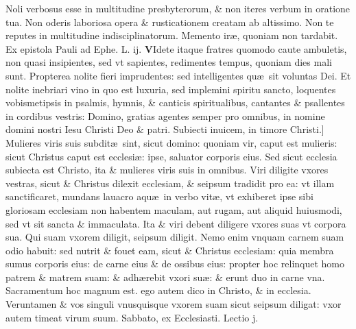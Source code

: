 \documentclass[a5paper,10pt]{book}
\def\leftmarginnote{%
	\lrmarginnote{\hskip -\marginparsep \hskip -6.5em}}
\def\ae{æ}
\begin{document}
\begin{multicols*}{2}
Noli verbosus esse in multitudine presbyterorum, \& non iteres verbum in oratione tua.
Non oderis laboriosa opera \& rusticationem creatam ab altissimo. Non te reputes in multitudine indisciplinatorum. Memento ir\ae , quoniam non tardabit.
\fancyhead[C]{\color{red} Feria. vj. Dominic\ae . ij. Vagantium}
\newline {} \color{red} Ex epistola Pauli ad Ephe. \hfill L. ij. \color{black}
\vspace{-1.25em}
\lettrine[lines=2]{\bfseries \color{red} V}{}\textdagger Idete\leftmarginnote{\begin{flushright}c.5.c\end{flushright}} itaque fratres quomodo caute ambuletis, non quasi insipientes, sed vt sapientes, redimentes tempus, quoniam dies mali sunt.
Propterea nolite fieri imprudentes: sed intelligentes qu\ae \ sit voluntas Dei. Et nolite inebriari vino in quo est luxuria, sed implemini spiritu sancto, loquentes vobismetipsis in psalmis, hymnis, \& canticis spiritualibus, cantantes \& psallentes in cordibus vestris: Domino, gratias agentes semper pro omnibus, in nomine domini nostri Iesu Christi Deo \& patri.
Subiecti inuicem, in timore\leftmarginnote{\begin{flushright}D\end{flushright}} Christi.] Mulieres viris suis subdit\ae \ sint, sicut domino: quoniam vir, caput est mulieris: sicut Christus caput est ecclesi\ae : ipse, saluator corporis eius.
Sed sicut ecclesia subiecta est Christo, ita \& mulieres viris suis in omnibus.
Viri diligite vxores vestras, sicut \& Christus dilexit ecclesiam, \& seipsum tradidit pro ea: vt illam sanctificaret, mundans lauacro aqu\ae \ in verbo vit\ae , vt exhiberet ipse sibi gloriosam ecclesiam non habentem maculam, aut rugam, aut aliquid huiusmodi, sed vt sit sancta \& immaculata.
Ita \& viri debent diligere vxores suas vt corpora sua. Qui suam vxorem diligit, seipsum diligit. Nemo enim vnquam carnem suam odio habuit: sed nutrit \& fouet eam, sicut \& Christus ecclesiam: quia membra sumus corporis eius: de carne eius \& de ossibus eius: propter hoc relinquet homo patrem \& matrem suam: \& adh\ae rebit vxori su\ae : \& erunt duo in carne vna.
Sacramentum hoc magnum est. ego autem dico in Christo, \& in ecclesia. Veruntamen \& vos singuli vnusquisque vxorem suam sicut seipsum diligat: vxor autem timeat virum suum.
\newline {} \color{red} \hypertarget{SAT-SECVNDA-VAGAN}{Sabbato,} ex Ecclesiasti. Lectio j. \color{black}

\end{multicols*}
\end{document}
